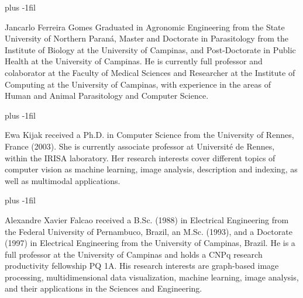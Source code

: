 \documentclass[10pt,twocolumn,twoside]{IEEEtran}
\begin{document}
\baselineskip plus -1fil
\begin{IEEEbiographynophoto}{Jancarlo Ferreira Gomes}
Graduated in Agronomic Engineering from the State University of Northern Paraná, Master and Doctorate in Parasitology from the Institute of Biology at the University of Campinas, and Post-Doctorate in Public Health at the University of Campinas. He is currently full professor and colaborator at the Faculty of Medical Sciences and Researcher at the Institute of Computing at the University of Campinas, with experience in the areas of Human and Animal Parasitology and Computer Science.
\end{IEEEbiographynophoto}
\baselineskip plus -1fil
\begin{IEEEbiographynophoto}{Ewa Kijak}
received a Ph.D. in Computer Science from the University of Rennes, France (2003). She is currently associate professor at Université de Rennes, within the IRISA laboratory. Her research interests cover different topics of computer vision as machine learning, image analysis, description and indexing, as well as multimodal applications.

\end{IEEEbiographynophoto}
\baselineskip plus -1fil
\begin{IEEEbiographynophoto}{Alexandre Xavier Falcao}
received a B.Sc. (1988) in Electrical Engineering from the Federal University of Pernambuco, Brazil, an M.Sc. (1993), and a Doctorate (1997) in Electrical Engineering from the University of Campinas, Brazil. He is a full professor at the University of Campinas and holds a CNPq research productivity fellowship PQ 1A. His research interests are graph-based image processing, multidimensional data visualization, machine learning, image analysis, and their applications in the Sciences and Engineering. 
\end{IEEEbiographynophoto}
\end{document}
